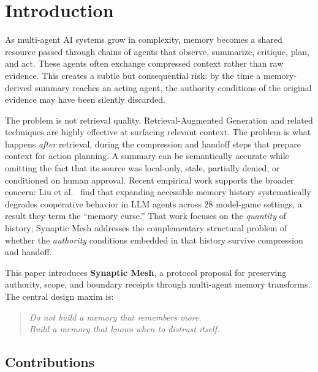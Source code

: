 \documentclass[11pt]{article}
\begin{document}
\section{Introduction}

As multi-agent AI systems grow in complexity, memory becomes a shared resource
passed through chains of agents that observe, summarize, critique, plan, and act.
These agents often exchange compressed context rather than raw evidence. This creates
a subtle but consequential risk: by the time a memory-derived summary reaches an
acting agent, the authority conditions of the original evidence may have been silently
discarded.

The problem is not retrieval quality. Retrieval-Augmented Generation and related
techniques \cite{R01_Lewis2020_RAG, R02_Gao2023_RAGSurvey} are highly effective at
surfacing relevant context. The problem is what happens \emph{after} retrieval, during
the compression and handoff steps that prepare context for action planning. A summary
can be semantically accurate while omitting the fact that its source was local-only,
stale, partially denied, or conditioned on human approval. Recent empirical work
supports the broader concern: Liu et al.~\cite{R19_Liu2026_MemoryCurse} find that
expanding accessible memory history systematically degrades cooperative behavior in
LLM agents across 28 model-game settings, a result they term the ``memory curse.''
That work focuses on the \emph{quantity} of history; Synaptic Mesh addresses the
complementary structural problem of whether the \emph{authority} conditions embedded
in that history survive compression and handoff.

This paper introduces \textbf{Synaptic Mesh}, a protocol proposal for preserving
authority, scope, and boundary receipts through multi-agent memory transforms. The
central design maxim is:

\begin{quote}
\textit{Do not build a memory that remembers more.\\
Build a memory that knows when to distrust itself.}
\end{quote}

\subsection*{Contributions}
\end{document}
